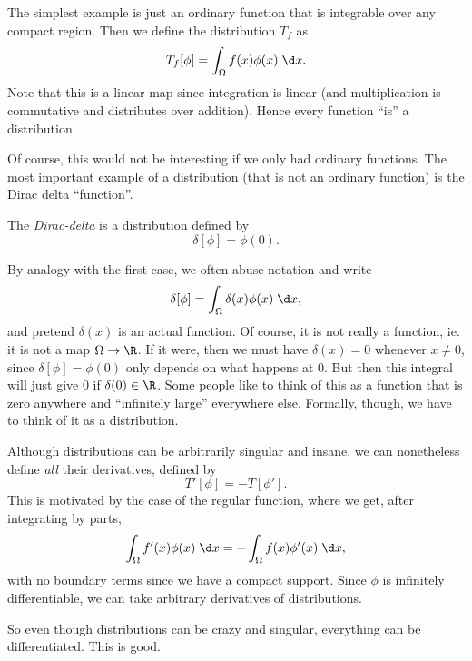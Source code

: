 \documentclass[a4paper]{article}
\begin{document}
\begin{eg}
  The simplest example is just an ordinary function that is integrable over any compact region. Then we define the distribution $T_f$ as
  \[
    T_f[\phi] = \int_\Omega f(x) \phi(x) \;\d x.
  \]
  Note that this is a linear map since integration is linear (and multiplication is commutative and distributes over addition). Hence every function ``is'' a distribution.
\end{eg}
Of course, this would not be interesting if we only had ordinary functions. The most important example of a distribution (that is not an ordinary function) is the Dirac delta ``function''.
\begin{defi}
  The \emph{Dirac-delta} is a distribution defined by
  \[
    \delta[\phi] = \phi(0).
  \]
\end{defi}
By analogy with the first case, we often abuse notation and write
\[
  \delta[\phi] = \int_\Omega \delta(x) \phi(x) \;\d x,
\]
and pretend $\delta(x)$ is an actual function. Of course, it is not really a function, ie. it is not a map $\Omega \to \R$. If it were, then we must have $\delta(x) = 0$ whenever $x \not = 0$, since $\delta[\phi] = \phi(0)$ only depends on what happens at $0$. But then this integral will just give $0$ if $\delta(0) \in \R$. Some people like to think of this as a function that is zero anywhere and ``infinitely large'' everywhere else. Formally, though, we have to think of it as a distribution.

Although distributions can be arbitrarily singular and insane, we can nonetheless define \emph{all} their derivatives, defined by
\[
  T'[\phi] = -T[\phi'].
\]
This is motivated by the case of the regular function, where we get, after integrating by parts,
\[
  \int_\Omega f'(x) \phi(x)\;\d x = -\int_\Omega f(x)\phi'(x) \;\d x,
\]
with no boundary terms since we have a compact support. Since $\phi$ is infinitely differentiable, we can take arbitrary derivatives of distributions.

So even though distributions can be crazy and singular, everything can be differentiated. This is good.
\end{document}
